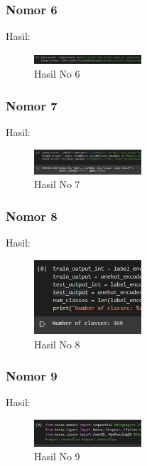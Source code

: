 \subsubsection{Nomor 6}
\hfill\break

Hasil:
\begin{figure}[H]
\centering
	\includegraphics[width=4cm]{figures/1174066/7/no6.jpg}
	\caption{Hasil No 6}
\end{figure}

\subsubsection{Nomor 7}
\hfill\break

Hasil:
\begin{figure}[H]
\centering
	\includegraphics[width=4cm]{figures/1174066/7/no7.jpg}
	\caption{Hasil No 7}
\end{figure}

\subsubsection{Nomor 8}
\hfill\break

Hasil:
\begin{figure}[H]
\centering
	\includegraphics[width=4cm]{figures/1174066/7/no8.jpg}
	\caption{Hasil No 8}
\end{figure}

\subsubsection{Nomor 9}
\hfill\break

Hasil:
\begin{figure}[H]
\centering
	\includegraphics[width=4cm]{figures/1174066/7/no9.jpg}
	\caption{Hasil No 9}
\end{figure}

